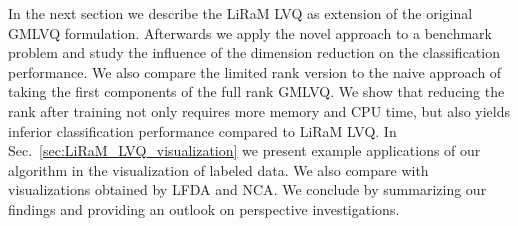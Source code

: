 In the next section we describe the \ac{LiRaM LVQ} as extension of the original \ac{GMLVQ} formulation. 
Afterwards we apply the novel approach to a benchmark problem and study the influence of the dimension 
reduction on the classification performance. 
We also compare the limited rank version to the naive approach of taking the first components of the full rank \ac{GMLVQ}. 
We show that reducing the rank after training not only requires more memory and CPU time, 
but also yields inferior classification performance compared to \ac{LiRaM LVQ}. 
In Sec.\ \ref{sec:LiRaM_LVQ_visualization} we present example applications of our algorithm in the visualization of labeled data. 
We also compare with visualizations obtained by \ac{LFDA} and \ac{NCA}. 
We conclude by summarizing our findings and providing an outlook on perspective investigations.